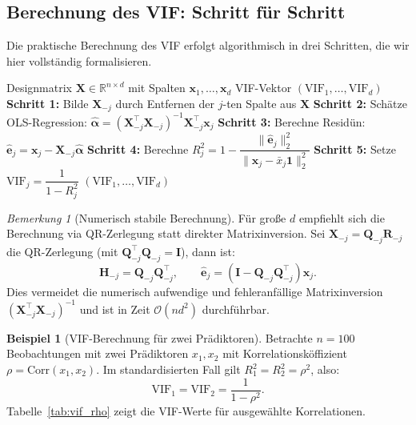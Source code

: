 ﻿\documentclass[12pt, a4paper]{article}
\theoremstyle{definition}
\newtheorem{example}[theorem]{Beispiel}
\theoremstyle{remark}
\newtheorem{remark}[theorem]{Bemerkung}
\newcommand{\R}{\mathbb{R}}
\newcommand{\vx}{\bm{x}}
\newcommand{\vX}{\bm{X}}
\newcommand{\T}{\top}
\begin{document}
\subsection{Berechnung des VIF: Schritt für Schritt}

Die praktische Berechnung des VIF erfolgt algorithmisch in drei Schritten, die wir hier
vollständig formalisieren.

\begin{algorithm}[H]
	\caption{Berechnung der Varianzinflationsfaktoren}
	\label{alg:vif}
	\begin{algorithmic}[1]
		\Require Designmatrix $\vX \in \R^{n \times d}$ mit Spalten $\vx_1, \ldots, \vx_d$
		\Ensure VIF-Vektor $(\mathrm{VIF}_1, \ldots, \mathrm{VIF}_d)$
		\State \textbf{Schritt 1:} Bilde $\vX_{-j}$ durch Entfernen der $j$-ten Spalte aus $\vX$
		\State \textbf{Schritt 2:} Schätze OLS-Regression: $\hat{\bm{\alpha}} = (\vX_{-j}^\T\vX_{-j})^{-1}\vX_{-j}^\T\vx_j$
		\State \textbf{Schritt 3:} Berechne Residün: $\hat{\bm{e}}_j = \vx_j - \vX_{-j}\hat{\bm{\alpha}}$
		\State \textbf{Schritt 4:} Berechne $R_j^2 = 1 - \dfrac{\|\hat{\bm{e}}_j\|_2^2}{\|\vx_j - \bar{x}_j\bm{1}\|_2^2}$
		\State \textbf{Schritt 5:} Setze $\mathrm{VIF}_j = \dfrac{1}{1 - R_j^2}$
		\EndFor
		\State \Return $(\mathrm{VIF}_1, \ldots, \mathrm{VIF}_d)$
	\end{algorithmic}
\end{algorithm}

\begin{remark}[Numerisch stabile Berechnung]
	Für große $d$ empfiehlt sich die Berechnung via QR-Zerlegung statt direkter 
	Matrixinversion. Sei $\vX_{-j} = \bm{Q}_{-j}\bm{R}_{-j}$ die QR-Zerlegung (mit 
	$\bm{Q}_{-j}^\T\bm{Q}_{-j} = \bm{I}$), dann ist:
	\[
	\bm{H}_{-j} = \bm{Q}_{-j}\bm{Q}_{-j}^\T, \qquad \hat{\bm{e}}_j = (\bm{I} - \bm{Q}_{-j}\bm{Q}_{-j}^\T)\vx_j.
	\]
	Dies vermeidet die numerisch aufwendige und fehleranfällige Matrixinversion 
	$(\vX_{-j}^\T\vX_{-j})^{-1}$ und ist in Zeit $\mathcal{O}(nd^2)$ durchführbar.
\end{remark}

\begin{example}[VIF-Berechnung für zwei Prädiktoren]
	Betrachte $n = 100$ Beobachtungen mit zwei Prädiktoren $x_1, x_2$ mit Korrelationsköffizient
	$\rho = \mathrm{Corr}(x_1, x_2)$. Im standardisierten Fall gilt $R_1^2 = R_2^2 = \rho^2$, also:
	\begin{equation}
		\mathrm{VIF}_1 = \mathrm{VIF}_2 = \frac{1}{1 - \rho^2}.
		\label{eq:vif_two_predictors}
	\end{equation}
	Tabelle~\ref{tab:vif_rho} zeigt die VIF-Werte für ausgewählte Korrelationen.
\end{example}
\end{document}
